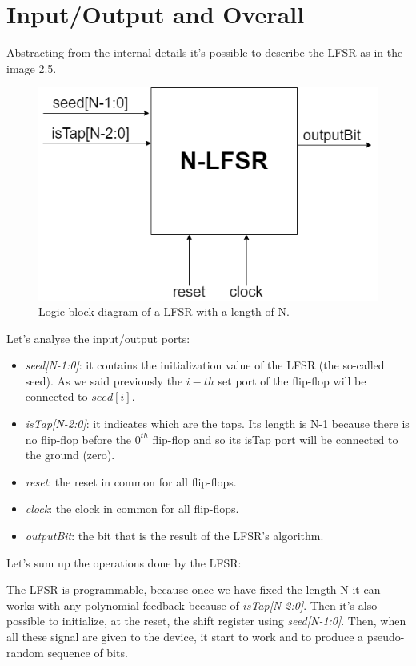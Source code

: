 \documentclass[a4paper]{report}
\begin{document}
\section{Input/Output and Overall}
Abstracting from the internal details it's possible to describe the LFSR as in the image 2.5.
\begin{figure}[htpb]
	\centering
	\includegraphics[scale=0.5]{img/LFSR-overall.png}
	\caption{Logic block diagram of a LFSR with a length of N.}
\end{figure}

\noindent Let's analyse the input/output ports:
\begin{itemize}
	\item \emph{seed[N-1:0]}: it contains the initialization value of the LFSR (the so-called seed). As we said previously the $i-th$ set port of the flip-flop will be connected to $seed[i]$.
	\item \emph{isTap[N-2:0]}: it indicates which are the taps. Its length is N-1 because there is no flip-flop before the $0^{th}$ flip-flop and so its isTap port will be connected to the ground (zero).
	\item \emph{reset}: the reset in common for all flip-flops.
	\item \emph{clock}: the clock in common for all flip-flops.
	\item \emph{outputBit}: the bit that is the result of the LFSR's algorithm.
\end{itemize} 
Let's sum up the operations done by the LFSR:

\noindent The LFSR is programmable, because once we have fixed the length N it can works with any polynomial feedback because of \emph{isTap[N-2:0]}. Then it's also possible to initialize, at the reset, the shift register using \emph{seed[N-1:0]}. Then, when all these signal are given to the device, it start to work and to produce a pseudo-random sequence of bits.
\end{document}
